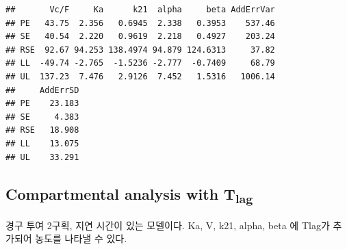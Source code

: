 \documentclass[
  11pt,
  krantz2, a4paper, twoside]{krantz}
\theoremstyle{definition}
\theoremstyle{definition}
\theoremstyle{definition}
\theoremstyle{definition}
\theoremstyle{remark}
\begin{document}
\begin{verbatim}
##       Vc/F     Ka      k21  alpha     beta AddErrVar
## PE   43.75  2.356   0.6945  2.338   0.3953    537.46
## SE   40.54  2.220   0.9619  2.218   0.4927    203.24
## RSE  92.67 94.253 138.4974 94.879 124.6313     37.82
## LL  -49.74 -2.765  -1.5236 -2.777  -0.7409     68.79
## UL  137.23  7.476   2.9126  7.452   1.5316   1006.14
##     AddErrSD
## PE    23.183
## SE     4.383
## RSE   18.908
## LL    13.075
## UL    33.291
\end{verbatim}

\subsection{\texorpdfstring{Compartmental analysis with T\textsubscript{lag}}{Compartmental analysis with Tlag}}\label{compartmental-analysis-with-tlag-1}

경구 투여 2구획, 지연 시간이 있는 모델이다. Ka, V, k21, alpha, beta 에 Tlag가 추가되어 농도를 나타낼 수 있다.
\end{document}

